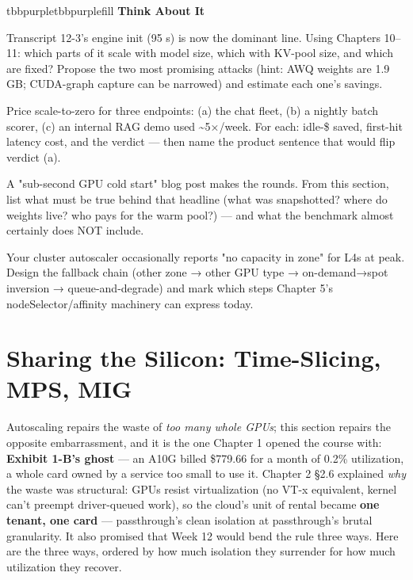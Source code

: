 \begin{calloutbox}{tbbpurple}{tbbpurplefill}
{\normalsize\bfseries\color{tbbpurple}Think About It}\par\vspace{3pt}
\begin{tbbitemize}
  \item Transcript 12-3's engine init (95 s) is now the dominant line. Using Chapters 10–11: which parts of it scale with model size, which with KV-pool size, and which are fixed? Propose the two most promising attacks (hint: AWQ weights are 1.9 GB; CUDA-graph capture can be narrowed) and estimate each one's savings.
  \item Price scale-to-zero for three endpoints: (a) the chat fleet, (b) a nightly batch scorer, (c) an internal RAG demo used \textasciitilde{}5×/week. For each: idle-\$ saved, first-hit latency cost, and the verdict — then name the product sentence that would flip verdict (a).
  \item A "sub-second GPU cold start" blog post makes the rounds. From this section, list what must be true behind that headline (what was snapshotted? where do weights live? who pays for the warm pool?) — and what the benchmark almost certainly does NOT include.
  \item Your cluster autoscaler occasionally reports "no capacity in zone" for L4s at peak. Design the fallback chain (other zone → other GPU type → on-demand→spot inversion → queue-and-degrade) and mark which steps Chapter 5's nodeSelector/affinity machinery can express today.
\end{tbbitemize}
\end{calloutbox}

\section{Sharing the Silicon: Time-Slicing, MPS, MIG}

Autoscaling repairs the waste of \textit{too many whole GPUs}; this section repairs the opposite embarrassment, and it is the one Chapter 1 opened the course with: \textbf{Exhibit 1-B's ghost} — an A10G billed \$779.66 for a month of 0.2\% utilization, a whole card owned by a service too small to use it. Chapter 2 §2.6 explained \textit{why} the waste was structural: GPUs resist virtualization (no VT-x equivalent, kernel can't preempt driver-queued work), so the cloud's unit of rental became \textbf{one tenant, one card} — passthrough's clean isolation at passthrough's brutal granularity. It also promised that Week 12 would bend the rule three ways. Here are the three ways, ordered by how much isolation they surrender for how much utilization they recover.

